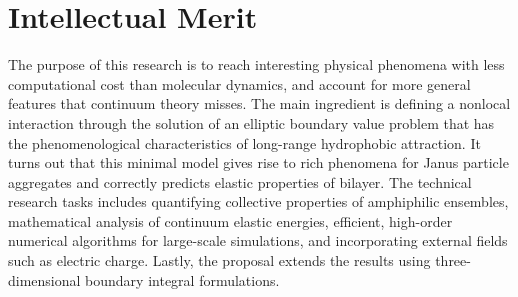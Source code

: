 
%
%

\section{Intellectual Merit}
The purpose of this research is to reach interesting physical phenomena with 
less computational cost than molecular dynamics, and account for more general
features that continuum theory misses. The main ingredient is defining a 
nonlocal interaction through the solution of an elliptic boundary value problem
that has the phenomenological characteristics of long-range hydrophobic
attraction. It turns out that this minimal model gives rise to rich phenomena
for Janus particle aggregates and correctly predicts elastic properties of bilayer. 
The technical research tasks includes quantifying collective properties of 
amphiphilic ensembles, mathematical analysis of continuum elastic energies, 
efficient, high-order numerical algorithms for large-scale simulations, and 
incorporating external fields such as electric charge. Lastly, the proposal 
extends the results using three-dimensional boundary integral formulations.


